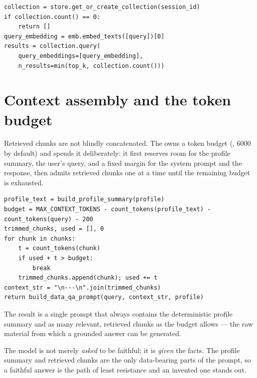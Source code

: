 \begin{lstlisting}[style=py,caption={Guarded top-k retrieval.}]
collection = store.get_or_create_collection(session_id)
if collection.count() == 0:
    return []
query_embedding = emb.embed_texts([query])[0]
results = collection.query(
    query_embeddings=[query_embedding],
    n_results=min(top_k, collection.count()))
\end{lstlisting}

\section{Context assembly and the token budget}
Retrieved chunks are not blindly concatenated. The  owns a
token budget (, 6000 by default) and spends it
deliberately: it first reserves room for the profile summary, the user's query,
and a fixed margin for the system prompt and the response, then admits retrieved
chunks one at a time until the remaining budget is exhausted.

\begin{lstlisting}[style=py,caption={Token-budgeted context assembly.}]
profile_text = build_profile_summary(profile)
budget = MAX_CONTEXT_TOKENS - count_tokens(profile_text) - count_tokens(query) - 200
trimmed_chunks, used = [], 0
for chunk in chunks:
    t = count_tokens(chunk)
    if used + t > budget:
        break
    trimmed_chunks.append(chunk); used += t
context_str = "\n---\n".join(trimmed_chunks)
return build_data_qa_prompt(query, context_str, profile)
\end{lstlisting}

The result is a single prompt that always contains the deterministic profile
summary and as many relevant, retrieved chunks as the budget allows --- the
raw material from which a grounded answer can be generated.

\begin{uanote}
The model is not merely \emph{asked} to be faithful; it is \emph{given} the
facts. The profile summary and retrieved chunks are the only data-bearing parts
of the prompt, so a faithful answer is the path of least resistance and an
invented one stands out.
\end{uanote}
